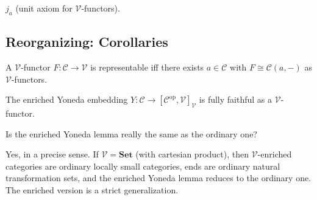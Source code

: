 \begin{prooflog}
{$j_a$ (unit axiom for $\mathcal{V}$-functors).}
\end{prooflog}

\subsection{Reorganizing: Corollaries}

\begin{corollary}
A $\mathcal{V}$-functor $F : \mathcal{C} \to \mathcal{V}$ is representable iff
there exists $a \in \mathcal{C}$ with $F \cong \mathcal{C}(a,-)$ as
$\mathcal{V}$-functors.
\end{corollary}

\begin{corollary}
The enriched Yoneda embedding $Y : \mathcal{C} \to [\mathcal{C}^{\mathrm{op}},
\mathcal{V}]_\mathcal{V}$ is fully faithful as a $\mathcal{V}$-functor.
\end{corollary}

\begin{dialog}
Is the enriched Yoneda lemma really the same as the ordinary one?

Yes, in a precise sense. If $\mathcal{V} = \mathbf{Set}$ (with cartesian
product), then $\mathcal{V}$-enriched categories are ordinary locally small
categories, ends are ordinary natural transformation sets, and the enriched
Yoneda lemma reduces to the ordinary one. The enriched version is a strict
generalization.
\end{dialog}


